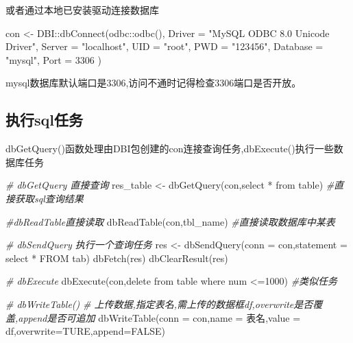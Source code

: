 \documentclass[
]{book}
\newenvironment{Shaded}{\begin{snugshade}}{\end{snugshade}}
\newcommand{\AttributeTok}[1]{\textcolor[rgb]{0.77,0.63,0.00}{#1}}
\newcommand{\CommentTok}[1]{\textcolor[rgb]{0.56,0.35,0.01}{\textit{#1}}}
\newcommand{\ConstantTok}[1]{\textcolor[rgb]{0.00,0.00,0.00}{#1}}
\newcommand{\DecValTok}[1]{\textcolor[rgb]{0.00,0.00,0.81}{#1}}
\newcommand{\FunctionTok}[1]{\textcolor[rgb]{0.00,0.00,0.00}{#1}}
\newcommand{\NormalTok}[1]{#1}
\newcommand{\OtherTok}[1]{\textcolor[rgb]{0.56,0.35,0.01}{#1}}
\newcommand{\SpecialCharTok}[1]{\textcolor[rgb]{0.00,0.00,0.00}{#1}}
\newcommand{\StringTok}[1]{\textcolor[rgb]{0.31,0.60,0.02}{#1}}
\begin{document}
或者通过本地已安装驱动连接数据库

\begin{Shaded}
\begin{Highlighting}[]
\NormalTok{con }\OtherTok{\textless{}{-}}\NormalTok{ DBI}\SpecialCharTok{::}\FunctionTok{dbConnect}\NormalTok{(odbc}\SpecialCharTok{::}\FunctionTok{odbc}\NormalTok{(),}
  \AttributeTok{Driver =} \StringTok{"MySQL ODBC 8.0 Unicode Driver"}\NormalTok{,}
  \AttributeTok{Server =} \StringTok{"localhost"}\NormalTok{, }\AttributeTok{UID =} \StringTok{"root"}\NormalTok{, }\AttributeTok{PWD =} \StringTok{"123456"}\NormalTok{, }\AttributeTok{Database =} \StringTok{"mysql"}\NormalTok{,}
  \AttributeTok{Port =} \DecValTok{3306}
\NormalTok{)}
\end{Highlighting}
\end{Shaded}

mysql数据库默认端口是3306,访问不通时记得检查3306端口是否开放。

\hypertarget{ux6267ux884csqlux4efbux52a1}{%
\subsection{执行sql任务}\label{ux6267ux884csqlux4efbux52a1}}

dbGetQuery()函数处理由DBI包创建的con连接查询任务,dbExecute()执行一些数据库任务

\begin{Shaded}
\begin{Highlighting}[]
\CommentTok{\# dbGetQuery 直接查询}
\NormalTok{res\_table }\OtherTok{\textless{}{-}} \FunctionTok{dbGetQuery}\NormalTok{(con,}\StringTok{\textquotesingle{}select * from table\textquotesingle{}}\NormalTok{) }\CommentTok{\#直接获取sql查询结果}

\CommentTok{\#dbReadTable直接读取}
\FunctionTok{dbReadTable}\NormalTok{(con,}\StringTok{\textquotesingle{}tbl\_name\textquotesingle{}}\NormalTok{) }\CommentTok{\#直接读取数据库中某表}

\CommentTok{\# dbSendQuery 执行一个查询任务 }
\NormalTok{res }\OtherTok{\textless{}{-}} \FunctionTok{dbSendQuery}\NormalTok{(}\AttributeTok{conn =}\NormalTok{ con,}\AttributeTok{statement =} \StringTok{\textquotesingle{}select * FROM tab\textquotesingle{}}\NormalTok{)}
\FunctionTok{dbFetch}\NormalTok{(res)}
\FunctionTok{dbClearResult}\NormalTok{(res)}

\CommentTok{\# dbExecute}
\FunctionTok{dbExecute}\NormalTok{(con,}\StringTok{\textquotesingle{}delete from table where num \textless{}=1000\textquotesingle{}}\NormalTok{) }\CommentTok{\#类似任务}

\CommentTok{\# dbWriteTable()}
\CommentTok{\# 上传数据,指定表名,需上传的数据框df,overwrite是否覆盖,append是否可追加}
\FunctionTok{dbWriteTable}\NormalTok{(}\AttributeTok{conn =}\NormalTok{ con,}\AttributeTok{name =} \StringTok{\textquotesingle{}表名\textquotesingle{}}\NormalTok{,}\AttributeTok{value =}\NormalTok{ df,}\AttributeTok{overwrite=}\NormalTok{TURE,}\AttributeTok{append=}\ConstantTok{FALSE}\NormalTok{)}
\end{Highlighting}
\end{Shaded}
\end{document}
